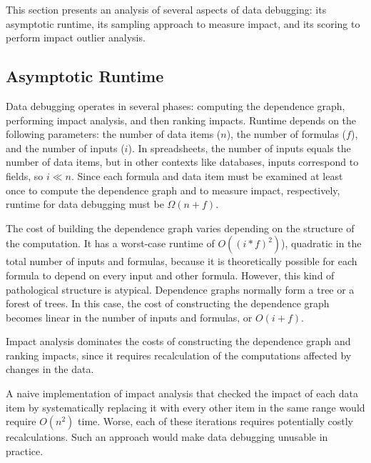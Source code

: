 
This section presents an analysis of several aspects of data
debugging: its asymptotic runtime, its sampling
approach to measure impact, and its scoring to perform impact outlier analysis.

\subsection{Asymptotic Runtime}
\label{sec:asymptotic_analysis}

Data debugging operates in several phases: computing the dependence
graph, performing impact analysis, and then ranking impacts. Runtime
depends on the following parameters: the number of data items ($n$),
the number of formulas ($f$), and the number of inputs ($i$). In
spreadsheets, the number of inputs equals the number of data items,
but in other contexts like databases, inputs correspond to fields, so
$i \ll n$. Since each formula and data item must be examined at least
once to compute the dependence graph and to measure impact,
respectively, runtime for data debugging must be 
$\Omega(n+f)$.

The cost of building the dependence graph varies depending on the
structure of the computation. It has a worst-case runtime of
$O((i*f)^2)$), quadratic in the total number of inputs and formulas,
because it is theoretically possible for each formula to depend on
every input and other formula. However, this kind of pathological
structure is atypical. Dependence graphs normally form a tree or a
forest of trees. In this case, the cost of constructing the dependence
graph becomes linear in the number of inputs and formulas, or
$O(i+f)$.

Impact analysis dominates the costs of constructing the dependence
graph and ranking impacts, since it requires recalculation of the
computations affected by changes in the data.

A naive implementation of impact analysis that checked the impact of
each data item by systematically replacing it with every other item in
the same range would require $O(n^2)$ time. Worse, each of these
iterations requires potentially costly recalculations. Such an
approach would make data debugging unusable in practice.
 
